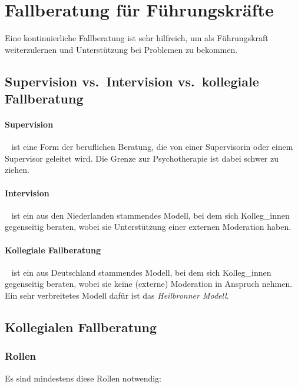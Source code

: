 \section{Fallberatung für Führungskräfte}
\label{fallberatung}

Eine kontinuierliche Fallberatung ist sehr hilfreich, um als Führungskraft weiterzulernen und Unterstützung bei Problemen zu bekommen.


\subsection{Supervision vs.~Intervision vs.~kollegiale Fallberatung}

\paragraph{Supervision}~\cite{supervision} ist eine Form der beruflichen Beratung, die von einer Supervisorin oder einem Supervisor geleitet wird. Die Grenze zur Psychotherapie ist dabei schwer zu ziehen.

\paragraph{Intervision}~\cite{intervision} ist ein aus den Niederlanden stammendes Modell, bei dem sich Kolleg\_innen gegenseitig beraten, wobei sie Unterstützung einer externen Moderation haben.

\paragraph{Kollegiale Fallberatung}~\cite{kollegiale-fallberatung} ist ein aus Deutschland stammendes Modell, bei dem sich Kolleg\_innen gegenseitig beraten, wobei sie keine (externe) Moderation in Anspruch nehmen. Ein sehr verbreitetes Modell dafür ist das \emph{Heilbronner Modell}.


\subsection{Kollegialen Fallberatung}


\subsubsection{Rollen}

Es sind mindestens diese Rollen notwendig:~\cite{kollegiale-fallberatung}

